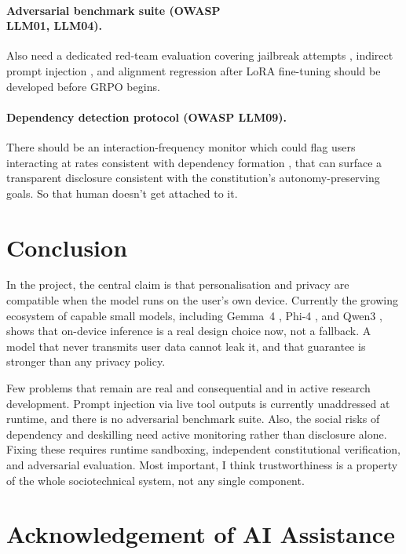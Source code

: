 \documentclass[11pt,a4paper]{article}
\begin{document}
\paragraph{Adversarial benchmark suite (OWASP \\LLM01, LLM04).} Also need a dedicated red-team evaluation covering jailbreak attempts \cite{zou2023}, indirect prompt injection \cite{logtoleak}, and alignment regression after LoRA fine-tuning should be developed before GRPO begins.

\paragraph{Dependency detection protocol (OWASP LLM09).} There should be an interaction-frequency monitor which could flag users interacting at rates consistent with dependency formation \cite{syntheticattachment}, that can surface a transparent disclosure consistent with the constitution's autonomy-preserving goals. So that human doesn't get attached to it.

\section{Conclusion}
\label{sec:conclusion}

In the project, the central claim is that personalisation and privacy are compatible when the model runs on the user's own device. Currently the growing ecosystem of capable small models, including Gemma~4 \cite{gemma2026}, Phi-4 \cite{phi4}, and Qwen3 \cite{qwen3}, shows that on-device inference is a real design choice now, not a fallback. A model that never transmits user data cannot leak it, and that guarantee is stronger than any privacy policy.

Few problems that remain are real and consequential and in active research development. Prompt injection via live tool outputs is currently unaddressed at runtime, and there is no adversarial benchmark suite. Also, the social risks of dependency and deskilling need active monitoring rather than disclosure alone. Fixing these requires runtime sandboxing, independent constitutional verification, and adversarial evaluation. Most important, I think trustworthiness is a property of the whole sociotechnical system, not any single component.





\section*{Acknowledgement of AI Assistance}
\end{document}
